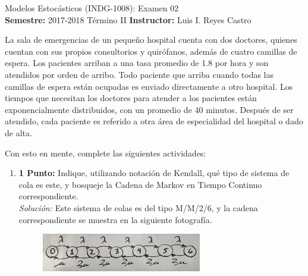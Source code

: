 \documentclass[ a4paper, twoside, 11pt]{article}
\newcommand{\numero}{02}
\begin{document}
\allowdisplaybreaks



\begin{center}
\Large Modelos Estoc\'asticos (INDG-1008): Examen \numero \\[2ex]
\small \textbf{Semestre:} 2017-2018 T\'ermino II \qquad
\textbf{Instructor:} Luis I. Reyes Castro
\end{center}
\fullskip

\begin{problem}
La sala de emergencias de un peque\~no hospital cuenta con dos doctores, quienes cuentan con sus propios consultorios y quir\'ofanos, adem\'as de cuatro camillas de espera. \linebreak Los pacientes arriban a una tasa promedio de 1.8 por hora y son atendidos por orden de arribo. \linebreak Todo paciente que arriba cuando todas las camillas de espera est\'an ocupadas es enviado directamente a otro hospital. Los tiempos que necesitan los doctores para atender a los pacientes est\'an exponencialmente distribuidos, con un promedio de 40 minutos. Despu\'es de ser atendido, cada paciente es referido a otra \'area de especialidad del hospital o dado de alta. 

Con esto en mente, complete las siguientes actividades: 
\begin{enumerate}[label=\textbf{\alph*)}]
\item \textbf{1 Punto:} Indique, utilizando notaci\'on de Kendall, qu\'e tipo de sistema de cola es este, y bosqueje la Cadena de Markov en Tiempo Continuo correspondiente. \\[1ex]
\emph{Soluci\'on:} Este sistema de colas es del tipo M/M/2/6, y la cadena correspondiente se muestra en la siguiente fotograf\'ia. 
\begin{figure}[htb]
\centering
\includegraphics[width=0.66\textwidth]{Problema-1A.jpg}
\end{figure}


\end{enumerate}
\end{problem}
\end{document}
